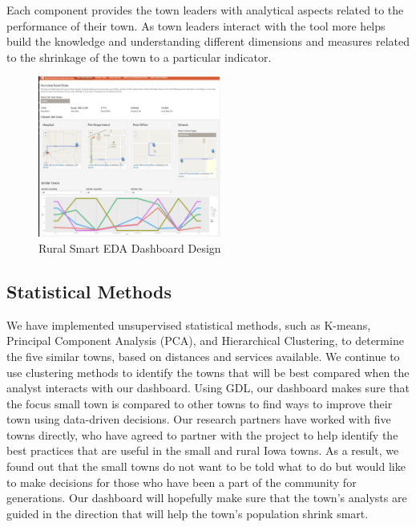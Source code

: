 \documentclass[10pt]{article}\usepackage[]{graphicx}\usepackage[]{color}
\begin{document}
Each component provides the town leaders with analytical aspects related to the performance of their town. As town leaders interact with the tool more helps build the knowledge and understanding different dimensions and measures related to the shrinkage of the town to a particular indicator.

\begin{figure}[ht!]
\centering
\includegraphics[width=60mm]{SCC_Dashboard_pcp2.png}
\caption{Rural Smart EDA Dashboard Design}
\end{figure}

\subsection{Statistical Methods}
We have implemented unsupervised statistical methods, such as K-means, Principal Component Analysis (PCA), and Hierarchical Clustering, to determine the five similar towns, based on distances and services available. We continue to use clustering methods to identify the towns that will be best compared when the analyst interacts with our dashboard. Using GDL, our dashboard makes sure that the focus small town is compared to other towns to find ways to improve their town using data-driven decisions. Our research partners have worked with five towns directly, who have agreed to partner with the project to help identify the best practices that are useful in the small and rural Iowa towns. As a result, we found out that the small towns do not want to be told what to do but would like to make decisions for those who have been a part of the community for generations. Our dashboard will hopefully make sure that the town's analysts are guided in the direction that will help the town's population shrink smart. 

\end{document}
